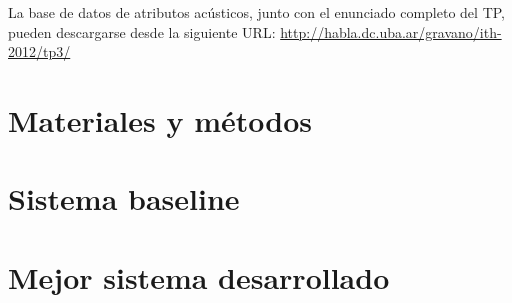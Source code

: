 \documentclass[10pt,a4paper]{article}
\begin{document}
La base de datos de atributos acústicos, junto con el enunciado completo del TP, pueden descargarse desde la siguiente URL: \url{http://habla.dc.uba.ar/gravano/ith-2012/tp3/}

\section{Materiales y métodos}

\lipsum[2]

\section{Sistema baseline}

\lipsum[3]

\section{Mejor sistema desarrollado}

\lipsum[4]
\end{document}
